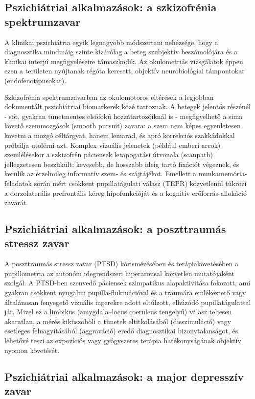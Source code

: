 \documentclass[12pt,a4paper,oneside]{book}
\begin{document}
\subsection{Pszichiátriai alkalmazások: a szkizofrénia spektrumzavar}

A klinikai pszichiátria egyik legnagyobb módszertani nehézsége, hogy a diagnosztika mindmáig szinte kizárólag a beteg szubjektív beszámolójára és a klinikai interjú megfigyeléseire támaszkodik. Az okulometriás vizsgálatok éppen ezen a területen nyújtanak régóta keresett, objektív neurobiológiai támpontokat (endofenotípusokat).

Szkizofrénia spektrumzavarban az okulomotoros eltérések a legjobban dokumentált pszichiátriai biomarkerek közé tartoznak. A betegek jelentős részénél - sőt, gyakran tünetmentes elsőfokú hozzátartozóiknál is - megfigyelhető a sima követő szemmozgások (smooth pursuit) zavara: a szem nem képes egyenletesen követni a mozgó céltárgyat, hanem lemarad, és apró korrekciós szakkádokkal próbálja utolérni azt. Komplex vizuális jelenetek (például emberi arcok) szemlélésekor a szkizofrén páciensek letapogatási útvonala (scanpath) jellegzetesen beszűkült: kevesebb, de hosszabb ideig tartó fixációt végeznek, és kerülik az érzelmileg informatív szem- és szájtájékot. Emellett a munkamemória-feladatok során mért csökkent pupillatágulati válasz (TEPR) közvetlenül tükrözi a dorzolaterális prefrontális kéreg hipofunkcióját és a kognitív erőforrás-allokáció zavarát.

\subsection{Pszichiátriai alkalmazások: a poszttraumás stressz zavar}

A poszttraumás stressz zavar (PTSD) kórismézésében és terápiakövetésében a pupillometria az autonóm idegrendszeri hiperarousal közvetlen mutatójaként szolgál. A PTSD-ben szenvedő páciensek szimpatikus alapaktivitása fokozott, ami gyakran csökkent nyugalmi pupilla-fluktuációval és a traumára emlékeztető vagy általánosan fenyegető vizuális ingerekre adott eltúlzott, elhúzódó pupillatágulattal jár. Mivel ez a limbikus (amygdala--locus coeruleus tengelyű) válasz teljesen akaratlan, a mérés kiküszöböli a tünetek eltitkolásából (disszimuláció) vagy esetleges felnagyításából (aggraváció) eredő diagnosztikai bizonytalanságot, és lehetővé teszi az expozíciós vagy gyógyszeres terápia hatékonyságának objektív nyomon követését.

\subsection{Pszichiátriai alkalmazások: a major depresszív zavar}
\end{document}
